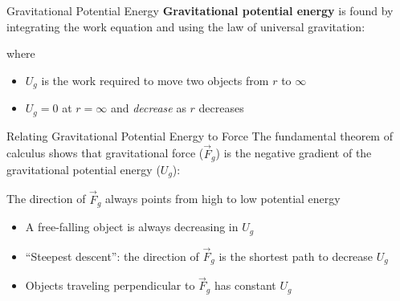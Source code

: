 \documentclass[12pt,compress,aspectratio=169]{beamer}
\begin{document}
\begin{frame}{Gravitational Potential Energy}
  \textbf{Gravitational potential energy} is found by integrating the work
  equation and using the law of universal gravitation:


  \vspace{-.1in}where
  
  \begin{itemize}
  \item $U_g$ is the work required to move two objects from $r$ to $\infty$
  \item $U_g=0$ at $r=\infty$ and \emph{decrease} as $r$ decreases
  \end{itemize}
\end{frame}



\begin{frame}{Relating Gravitational Potential Energy to Force}
  The fundamental theorem of calculus shows that gravitational force
  ($\vec F_g$) is the negative gradient of the gravitational potential energy
  ($U_g$):
  

  The direction of $\vec F_g$ always points from high to low potential energy
  \begin{itemize}
  \item A free-falling object is always decreasing in $U_g$
  \item ``Steepest descent'': the direction of $\vec F_g$ is the shortest path
    to decrease $U_g$ 
  \item Objects traveling perpendicular to $\vec F_g$ has constant $U_g$
  \end{itemize}
\end{frame}
\end{document}
